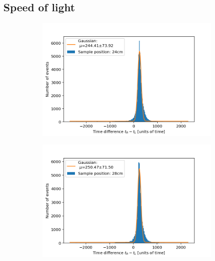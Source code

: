\documentclass[]{article}
\begin{document}
\subsection{Speed of light}
\begin{figure}[H]
\centering
\medskip
\begin{subfigure}{0.48\textwidth}
\includegraphics[width=\linewidth]{Plots/Pos/24cm.png}
\end{subfigure}
\begin{subfigure}[c]{0.48\linewidth}
\includegraphics[width=\linewidth]{Plots/Pos/28cm.png}
\end{subfigure}


\end{figure}
\end{document}
